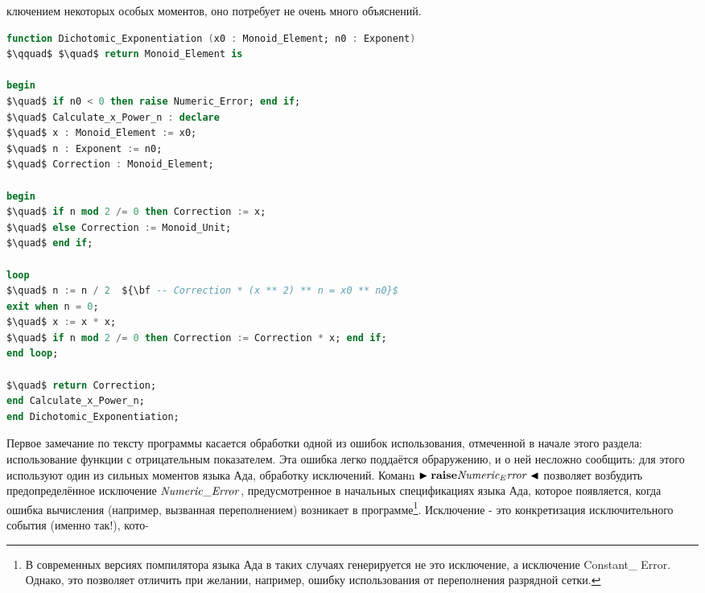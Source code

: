 
\noindent ключением некоторых особых моментов, оно потребует не очень много объяснений.
\begin{lstlisting}[mathescape=true, language=Ada, basicstyle=\small]
function Dichotomic_Exponentiation (x0 : Monoid_Element; n0 : Exponent)
$\qquad$ $\quad$ return Monoid_Element is

begin
$\quad$ if n0 < 0 then raise Numeric_Error; end if;
$\quad$ Calculate_x_Power_n : declare
$\quad$ x : Monoid_Element := x0;
$\quad$ n : Exponent := n0;
$\quad$ Correction : Monoid_Element;

begin
$\quad$ if n mod 2 /= 0 then Correction := x;
$\quad$ else Correction := Monoid_Unit;
$\quad$ end if;

loop
$\quad$ n := n / 2  ${\bf -- Correction * (x ** 2) ** n = x0 ** n0}$
exit when n = 0;
$\quad$ x := x * x;
$\quad$ if n mod 2 /= 0 then Correction := Correction * x; end if;
end loop;

$\quad$ return Correction;
end Calculate_x_Power_n;
end Dichotomic_Exponentiation;

\end{lstlisting}
 
 \par Первое замечание по тексту программы касается обработки одной из ошибок использования, отмеченной в начале этого раздела: использование функции с отрицательным показателем. Эта ошибка легко поддаётся обраружению, и о ней несложно сообщить: для этого используют один из сильных моментов языка Ада, обработку исключений. Команn $\blacktriangleright {\bf raise} {\it Numeric_Error} \blacktriangleleft $ позволяет возбудить предопределённое исключение ${\it Numeric\_ Error}$, предусмотренное в начальных спецификациях языка Ада, которое появляется, когда ошибка вычисления (например, вызванная переполнением) возникает в программе\footnote{В современных версиях помпилятора языка Ада в таких случаях генерируется не это исключение, а исключение Constant\_ Error. Однако, это позволяет отличить при желании, например, ошибку использования от переполнения разрядной сетки.}. Исключение - это конкретизация исключительного события (именно так!), кото- 
 \newpage
 
